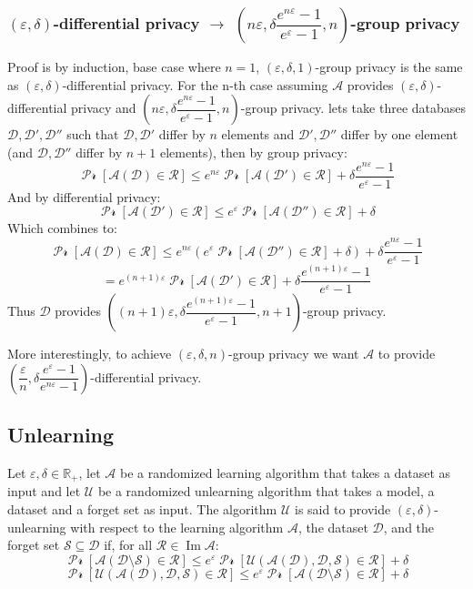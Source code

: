 \documentclass{article}
\DeclareMathOperator{\Ima}{Im}
\begin{document}
\subsubsection{$(\varepsilon, \delta)$-differential privacy $\rightarrow$ $(n \varepsilon, \delta \dfrac{e^{n\varepsilon} - 1}{e^\varepsilon - 1}, n)$-group privacy}

Proof is by induction, base case where $n = 1$, $(\varepsilon, \delta, 1)$-group privacy is the same as $(\varepsilon, \delta)$-differential privacy. 
For the n-th case assuming $\mathcal{A}$ provides $(\varepsilon, \delta)$-differential privacy and $(n \varepsilon, \delta \dfrac{e^{n\varepsilon} - 1}{e^\varepsilon - 1}, n)$-group privacy. lets take three databases $\mathcal{D, D', D''}$ such that $\mathcal{D, D'}$ differ by $n$ elements and $\mathcal{D', D''}$ differ by one element (and $\mathcal{D, D''}$ differ by $n+1$ elements), then by group privacy:
\[ \mathcal{\Pr[A(D) \in R]} \leq e^{n\varepsilon} \mathcal{\Pr[A(D') \in R]} + \delta \dfrac{e^{n\varepsilon} - 1}{e^\varepsilon - 1} \]
And by differential privacy:
\[ \mathcal{\Pr[A(D') \in R]} \leq e^\varepsilon \mathcal{\Pr[A(D'') \in R]} + \delta \]
Which combines to:
\[ \mathcal{\Pr[A(D) \in R]} \leq e^{n\varepsilon} (e^\varepsilon \mathcal{\Pr[A(D'') \in R]} + \delta) + \delta \dfrac{e^{n\varepsilon} - 1}{e^\varepsilon - 1} \]
\[ = e^{(n+1)\varepsilon} \mathcal{\Pr[A(D') \in R]} + \delta \dfrac{e^{(n+1)\varepsilon} - 1}{e^\varepsilon - 1} \]
Thus $\mathcal{D}$ provides $((n+1) \varepsilon, \delta \dfrac{e^{(n+1)\varepsilon} - 1}{e^\varepsilon - 1}, n+1)$-group privacy.

\vspace{10mm}

More interestingly, to achieve $(\varepsilon, \delta, n)$-group privacy we want $\mathcal{A}$ to provide $(\dfrac{\varepsilon}{n}, \delta \dfrac{e^\varepsilon - 1}{e^{n\varepsilon} - 1})$-differential privacy.

\subsection{Unlearning}

Let $\varepsilon, \delta \in \mathbb{R_+}$, let $\mathcal{A}$ be a randomized learning algorithm that takes a dataset as input and let $\mathcal{U}$ be a randomized unlearning algorithm that takes a model, a dataset and a forget set as input.
The algorithm $\mathcal{U}$ is said to provide $(\varepsilon, \delta)$-unlearning with respect to the learning algorithm $\mathcal{A}$, the dataset $\mathcal{D}$, and the forget set $\mathcal{S \subseteq D}$ if, for all $\mathcal{R} \in \Ima \mathcal{A}$:
\[ \mathcal{\Pr[A(D \setminus S) \in R]} \leq e^\varepsilon \mathcal{\Pr[U(A(D), D, S) \in R]} + \delta \]
\[ \mathcal{\Pr[U(A(D), D, S) \in R]} \leq e^\varepsilon \mathcal{\Pr[A(D \setminus S) \in R]} + \delta \]
\end{document}
